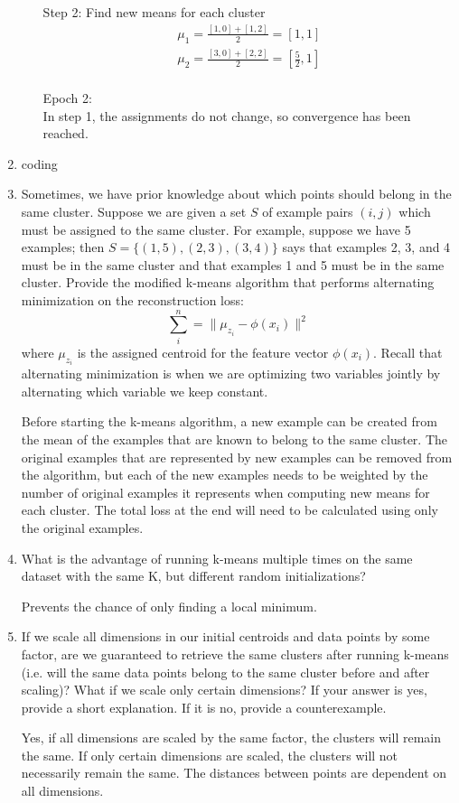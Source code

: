 \documentclass[10pt]{article}
\begin{document}
\begin{enumerate}[label=(\alph*)]
\begin{enumerate}[label=(\arabic*)]
	Step 2: Find new means for each cluster
	\begin{align*}
	\mu_1 = \frac{[1, 0] + [1, 2]}{2} = [1, 1]\\
	\mu_2 = \frac{[3, 0] + [2, 2]}{2} = [\frac{5}{2}, 1]\\
	\end{align*}
	
	Epoch 2:\\
	In step 1, the assignments do not change, so convergence has been reached.	
	
	\end{enumerate}
	
	\item coding
	
	\item Sometimes, we have prior knowledge about which points should belong in the same cluster. Suppose we are given a set $S$ of example pairs $(i,j)$ which must be assigned to the same cluster. For example, suppose we have 5 examples; then $S=\{(1,5),(2,3),(3,4)\}$ says that examples 2, 3, and 4 must be in the same cluster and that examples 1 and 5 must be in the same cluster. Provide the modified k-means algorithm that performs alternating minimization on the reconstruction loss:
$$\sum_i^n = \lVert \mu_{z_i} - \phi(x_i) \rVert^2$$
where $\mu_{z_i}$ is the assigned centroid for the feature vector $\phi(x_i)$. Recall that alternating minimization is when we are optimizing two variables jointly by alternating which variable we keep constant.

Before starting the k-means algorithm, a new example can be created from the mean of the examples that are known to belong to the same cluster. The original examples that are represented by new examples can be removed from the algorithm, but each of the new examples needs to be weighted by the number of original examples it represents when computing new means for each cluster. The total loss at the end will need to be calculated using only the original examples.

\item What is the advantage of running k-means multiple times on the same dataset with the same K, but different random initializations?

	Prevents the chance of only finding a local minimum.
	
\item If we scale all dimensions in our initial centroids and data points by some factor, are we guaranteed to retrieve the same clusters after running k-means (i.e. will the same data points belong to the same cluster before and after scaling)? What if we scale only certain dimensions? If your answer is yes, provide a short explanation. If it is no, provide a counterexample.

	Yes, if all dimensions are scaled by the same factor, the clusters will remain the same. If only certain dimensions are scaled, the clusters will not necessarily remain the same. The distances between points are dependent on all dimensions.
	
\end{enumerate}
\fi
\end{document}
